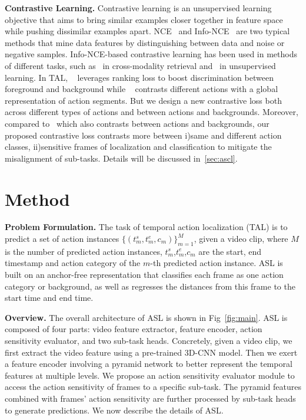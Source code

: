 \documentclass[10pt,twocolumn,letterpaper]{article}
\begin{document}
\par \textbf{Contrastive Learning.} Contrastive learning \cite{contra1,contra2,contra3} is an unsupervised learning objective that aims to bring similar examples closer together in feature space while pushing dissimilar examples apart. NCE~\cite{nce} and Info-NCE~\cite{infonce} are two typical methods that mine data features by distinguishing between data and noise or negative samples. Info-NCE-based contrastive learning has been used in methods of different tasks, such as~\cite{wang2022align,reler,Wang_2021_CVPR} in cross-modality retrieval and~\cite{moco,videomoco} in unsupervised learning.  In TAL, ~\cite{afsd} leverages ranking loss to boost discrimination between foreground and background while ~\cite{shi2022react} contrasts different actions with a global representation of action segments. But we design a new contrastive loss both across different types of actions and between actions and backgrounds. Moreover, compared to~\cite{shou2018autoloc} which also contrasts between actions and backgrounds, our proposed contrastive loss contrasts more between i)same and different action classes, ii)sensitive frames of localization and classification to mitigate the misalignment of sub-tasks. Details will be discussed in~\ref{sec:ascl}.

\vspace{1.0em}
\section{Method}
\textbf{Problem Formulation.}      
The task of temporal action localization (TAL) is to predict a set of action instances $\{(t_m^s,t_m^e,c_m)\}_{m=1}^M$, given a video clip, where $M$ is the number of predicted action instances, $t_m^s$,$t_m^e$,$c_m$ are the start, end timestamp and action category of the $m$-th predicted action instance. ASL is built on an anchor-free representation that classifies each frame as one action category or background, as well as regresses the distances from this frame to the start time and end time. 

\textbf{Overview.} 
The overall architecture of ASL is shown in Fig~\ref{fig:main}. 
ASL is composed of four parts: video feature extractor, feature encoder, action sensitivity evaluator, and two sub-task heads. 
Concretely, given a video clip, we first extract the video feature using a pre-trained 3D-CNN model. Then we exert a feature encoder involving a pyramid network to better represent the temporal features at multiple levels. We propose an action sensitivity evaluator module to access the action sensitivity of frames to a specific sub-task. The pyramid features combined with frames' action sensitivity are further processed by sub-task heads to generate predictions. We now describe the details of ASL.
\end{document}
